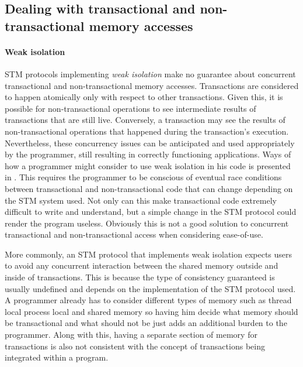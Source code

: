 \subsection{Dealing with transactional and non-transactional memory accesses}
\label{sec:SIsolutions}

\paragraph{Weak isolation}
STM protocols implementing \emph{weak isolation} make no guarantee
about concurrent transactional and non-transactional memory accesses.
Transactions are considered to  
happen atomically only with respect to other transactions.  Given this, it is possible
for non-transactional operations to see intermediate results  
of transactions that are still  live. Conversely, a transaction may see the
results of non-transactional operations that happened during  
the  transaction{}'s   execution.
Nevertheless, these concurrency issues can be anticipated and used
appropriately by the 
programmer,  still resulting  in correctly  functioning  applications.
Ways of how a programmer might consider to use weak isolation in his code
is presented in \cite{blundell06}.
This requires the programmer 
to  be conscious  of  eventual race  conditions  between transactional  and
non-transactional code that can change depending on the STM system used.
Not only can this make transactional code extremely difficult to write
and understand, but a simple change in the STM protocol could render the
program useless.
Obviously this is not a good solution to concurrent transactional and non-transactional
access when considering ease-of-use.

More commonly, an STM protocol that implements weak isolation expects users to avoid
any concurrent interaction between the shared memory outside and inside of
transactions.
This is because the type of consistency guaranteed is usually undefined
and depends on the implementation of the STM protocol used.
A programmer already has to consider different types of memory such as thread local
process local and shared memory so having him decide what memory should be transactional
and what should not be just adds an additional burden to the programmer.
Along with this, having a separate section of memory for transactions is also not consistent with
the concept of transactions being integrated within a program.

